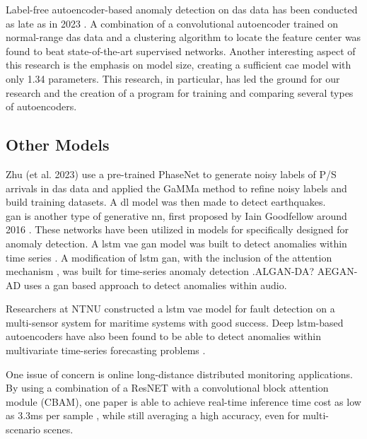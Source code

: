 Label-free autoencoder-based anomaly detection on \acrshort{das} data has been conducted as late as in 2023 \cite{xie2023label}. A combination of a convolutional autoencoder trained on normal-range \acrshort{das} data and a clustering algorithm to locate the feature center was found to beat state-of-the-art supervised networks. Another interesting aspect of this research is the emphasis on model size, creating a sufficient \acrshort{cae} model with only \qty{1.34}{\si{\kilo}} parameters. This research, in particular, has led the ground for our research and the creation of a program for training and comparing several types of autoencoders. \\





\subsection{Other Models}

Zhu (et al. 2023) \cite{zhu2023seismic} use a pre-trained PhaseNet to generate noisy labels of P/S arrivals in \acrshort{das} data and applied the GaMMa method to refine noisy labels and build training datasets. A \acrshort{dl} model was then made to detect earthquakes. \\


\acrshort{gan} is another type of generative nn, first proposed by Iain Goodfellow around 2016 \cite{goodfellow2016nips}. These networks have been utilized in models for specifically designed for anomaly detection. A \acrshort{lstm} \acrshort{vae} \acrshort{gan} model was built to detect anomalies within time series \cite{s20133738}. A modification of \acrshort{lstm} \acrshort{gan}, with the inclusion of the attention mechanism \cite{vaswani2017attention}, was built for time-series anomaly detection \cite{bashar2023algan}.ALGAN-DA?
AEGAN-AD \cite{jiang2023unsupervised} uses a \acrshort{gan} based approach to detect anomalies within audio.

Researchers at NTNU constructed a \acrshort{lstm} \acrshort{vae} model for fault detection on a multi-sensor system for maritime systems \cite{9514856} with good success. Deep \acrshort{lstm}-based autoencoders have also been found to be able to detect anomalies within multivariate time-series forecasting problems \cite{alaaDeepLstm2019}.

One issue of concern is online long-distance distributed monitoring applications. By using a combination of a ResNET with a convolutional block attention module (CBAM), one paper is able to achieve real-time inference time cost as low as 3.3ms per sample \cite{photonics9100677}, while still averaging a high accuracy, even for multi-scenario scenes. 



